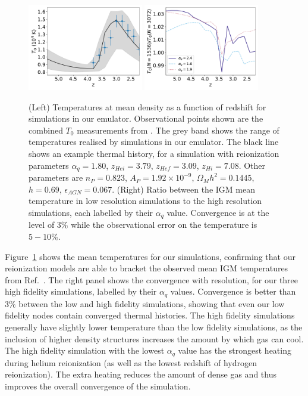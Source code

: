 \documentclass[a4paper,11pt]{article}
\begin{document}
\begin{figure}
\includegraphics[width=0.45\textwidth]{figures/mean-temperature.pdf}
\includegraphics[width=0.45\textwidth]{figures/mean-temperature-resolution.pdf}
 \caption{(Left) Temperatures at mean density as a function of redshift for simulations in our emulator. Observational points shown are the combined $T_0$ measurements from \protect\cite{Gaikwad:2021}.  The grey band shows the range of temperatures realised by simulations in our emulator. The black line shows an example thermal history, for a simulation with reionization parameters $\alpha_q = 1.80$, $z_{Hei} = 3.79$, $z_{Hef} = 3.09$, $z_{Hi} = 7.08$. Other parameters are $n_P = 0.823$, $A_P = 1.92 \times 10^{-9}$, $\Omega_M h^2 = 0.1445$, $h = 0.69$, $\epsilon_{AGN} = 0.067$.
 (Right) Ratio between the IGM mean temperature in low resolution simulations to the high resolution simulations, each labelled by their $\alpha_q$ value. Convergence is at the level of $3\%$ while the observational error on the temperature is $5-10\%$.
}
 \label{fig:meanigmtempdens}
\end{figure}

Figure~\ref{fig:meanigmtempdens} shows the mean temperatures for our simulations, confirming that our reionization models are able to bracket the observed mean IGM temperatures from Ref.~\cite{Gaikwad:2021}.
The right panel shows the convergence with resolution, for our three high fidelity simulations, labelled by their $\alpha_q$ values. Convergence is better than $3\%$ between the low and high fidelity simulations, showing that even our low fidelity nodes contain converged thermal histories.
The high fidelity simulations generally have slightly lower temperature than the low fidelity simulations, as the inclusion of higher density structures increases the amount by which gas can cool. The high fidelity simulation with the lowest $\alpha_q$ value has the strongest heating during helium reionization (as well as the lowest redshift of hydrogen reionization). The extra heating reduces the amount of dense gas and thus improves the overall convergence of the simulation.
\end{document}
